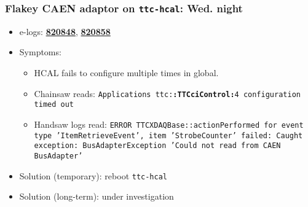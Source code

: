 \documentclass[bigger]{beamer}
\providecommand{\alert}[1]{\textbf{#1}}
\begin{document}
\begin{frame}
\frametitle{Flakey CAEN adaptor on \texttt{ttc-hcal}: Wed. night}
\label{sec-2-1-2}
\begin{itemize}

\item e-logs: \href{http://cmsonline.cern.ch/cms-elog/820848}{\alert{820848}}, \href{http://cmsonline.cern.ch/cms-elog/820858}{\alert{820858}}
\label{sec-2-1-2-1}%

\item Symptoms:
\label{sec-2-1-2-2}%
\begin{itemize}

\item HCAL fails to configure multiple times in global.
\label{sec-2-1-2-2-1}%

\item Chainsaw reads: \texttt{Applications ttc:\textbf{:TTCciControl:}4 configuration timed out}
\label{sec-2-1-2-2-2}%

\item Handsaw logs read: \texttt{ERROR TTCXDAQBase::actionPerformed for event type 'ItemRetrieveEvent', item 'StrobeCounter' failed: Caught exception: BusAdapterException 'Could not read from CAEN BusAdapter'}
\label{sec-2-1-2-2-3}%
\end{itemize} %

\item Solution (temporary): reboot \texttt{ttc-hcal}
\label{sec-2-1-2-3}%

\item Solution (long-term): under investigation
\label{sec-2-1-2-4}%
\end{itemize} %
\end{frame}
\end{document}
